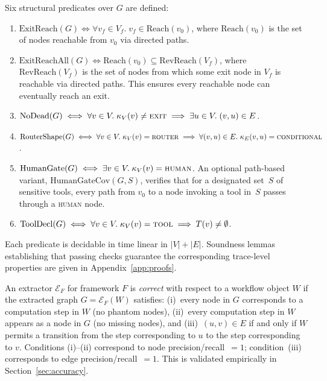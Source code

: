 \begin{definition}
\label{def:structural_predicates}
Six structural predicates over $G$ are defined:
\begin{enumerate}
  \item $\mathrm{ExitReach}(G) \iff \forall v_f \in V_f.\;
    v_f \in \mathrm{Reach}(v_0)$, where $\mathrm{Reach}(v_0)$ is the
    set of nodes reachable from $v_0$ via directed paths.
  \item $\mathrm{ExitReachAll}(G) \iff \mathrm{Reach}(v_0) \subseteq
    \mathrm{RevReach}(V_f)$, where $\mathrm{RevReach}(V_f)$ is the set
    of nodes from which some exit node in $V_f$ is reachable via directed
    paths. This ensures every reachable node can eventually reach an exit.
  \item $\mathrm{NoDead}(G) \iff \forall v \in V.\;
    \kappa_V(v) \neq \textsc{exit} \implies
    \exists u \in V.\; (v,u) \in E$.
  \item $\mathrm{RouterShape}(G) \iff \forall v \in V.\;
    \kappa_V(v) = \textsc{router} \implies
    \forall (v,u) \in E.\; \kappa_E(v,u) = \textsc{conditional}$.
  \item $\mathrm{HumanGate}(G) \iff \exists v \in V.\;
    \kappa_V(v) = \textsc{human}$.  An optional path-based variant,
    $\mathrm{HumanGateCov}(G, S)$, verifies that for a designated
    set~$S$ of sensitive tools, every path from $v_0$ to a node
    invoking a tool in~$S$ passes through a \textsc{human} node.
  \item $\mathrm{ToolDecl}(G) \iff \forall v \in V.\;
    \kappa_V(v) = \textsc{tool} \implies T(v) \neq \emptyset$.
\end{enumerate}
\end{definition}

\noindent
Each predicate is decidable in time linear in $|V| + |E|$.
Soundness lemmas establishing that passing checks guarantee the
corresponding trace-level properties are given in
Appendix~\ref{app:proofs}.

\begin{definition}
\label{def:extraction_correctness}
An extractor $\mathcal{E}_F$ for framework $F$ is \emph{correct} with
respect to a workflow object $W$ if the extracted graph
$G = \mathcal{E}_F(W)$ satisfies:
(i)~every node in $G$ corresponds to a computation step in $W$ (no
phantom nodes),
(ii)~every computation step in $W$ appears as a node in $G$ (no missing
nodes), and
(iii)~$(u, v) \in E$ if and only if $W$ permits a transition from the
step corresponding to $u$ to the step corresponding to $v$.
Conditions (i)--(ii) correspond to node precision/recall~$= 1$;
condition~(iii) corresponds to edge precision/recall~$= 1$.
This is validated empirically in Section~\ref{sec:accuracy}.
\end{definition}

